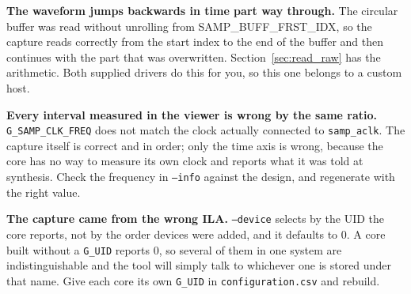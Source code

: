 \documentclass[../manual.tex]{subfiles}
\begin{document}
\textbf{The waveform jumps backwards in time part way through.} The circular buffer was read without unrolling from SAMP\_BUFF\_FRST\_IDX, so the capture reads correctly from the start index to the end of the buffer and then continues with the part that was overwritten. Section~\ref{sec:read_raw} has the arithmetic. Both supplied drivers do this for you, so this one belongs to a custom host.

\textbf{Every interval measured in the viewer is wrong by the same ratio.} \texttt{G\_SAMP\_CLK\_FREQ} does not match the clock actually connected to \texttt{samp\_aclk}. The capture itself is correct and in order; only the time axis is wrong, because the core has no way to measure its own clock and reports what it was told at synthesis. Check the frequency in \texttt{--info} against the design, and regenerate with the right value.

\textbf{The capture came from the wrong ILA.} \texttt{--device} selects by the UID the core reports, not by the order devices were added, and it defaults to 0. A core built without a \texttt{G\_UID} reports 0, so several of them in one system are indistinguishable and the tool will simply talk to whichever one is stored under that name. Give each core its own \texttt{G\_UID} in \texttt{configuration.csv} and rebuild.
\end{document}

